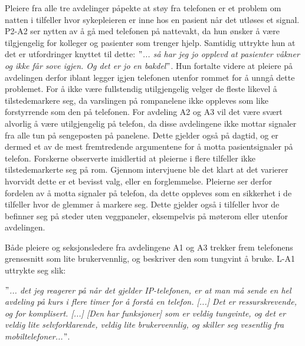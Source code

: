 \noindent
Pleiere fra alle tre avdelinger påpekte at støy fra telefonen er et problem om natten i tilfeller hvor sykepleieren er inne hos en pasient når det utløses et signal. P2-A2 ser nytten av å gå med telefonen på nattevakt, da hun ønsker å være tilgjengelig for kolleger og pasienter som trenger hjelp. Samtidig uttrykte hun at det er utfordringer knyttet til dette: \textit{ $"$... så har jeg jo opplevd at pasienter våkner og ikke får sove igjen. Og det er jo en bakdel$"$}. Hun fortalte videre at pleiere på avdelingen derfor iblant legger igjen telefonen utenfor rommet for å unngå dette problemet. For å ikke være fullstendig utilgjengelig velger de fleste likevel å tilstedemarkere seg, da varslingen på rompanelene ikke oppleves som like forstyrrende som den på telefonen. For avdeling A2 og A3 vil det være svært alvorlig å være utilgjengelig på telefon, da disse avdelingene ikke mottar signaler fra alle tun på sengeposten på panelene. Dette gjelder også på dagtid, og er dermed et av de mest fremtredende argumentene for å motta pasientsignaler på telefon. Forskerne observerte imidlertid at pleierne i flere tilfeller ikke tilstedemarkerte seg på rom. Gjennom intervjuene ble det klart at det varierer hvorvidt dette er et bevisst valg, eller en forglemmelse. Pleierne ser derfor fordelen av å motta signaler på telefon, da dette oppleves som en sikkerhet i de tilfeller hvor de glemmer å markere seg. Dette gjelder også i tilfeller hvor de befinner seg på steder uten veggpaneler, eksempelvis på møterom eller utenfor avdelingen.

\noindent
Både pleiere og seksjonsledere fra avdelingene A1 og A3 trekker frem telefonens grensesnitt som lite brukervennlig, og beskriver den som tungvint å bruke. L-A1 uttrykte seg slik:

\noindent
\textit{ $"$... det jeg reagerer på når det gjelder IP-telefonen, er at man må sende en hel avdeling på kurs i flere timer for å forstå en telefon. [...] Det er ressurskrevende, og for komplisert. [...] [Den har funksjoner] som er veldig tungvinte, og det er veldig lite selvforklarende, veldig lite brukervennlig, og skiller seg vesentlig fra mobiltelefoner...$"$}.

